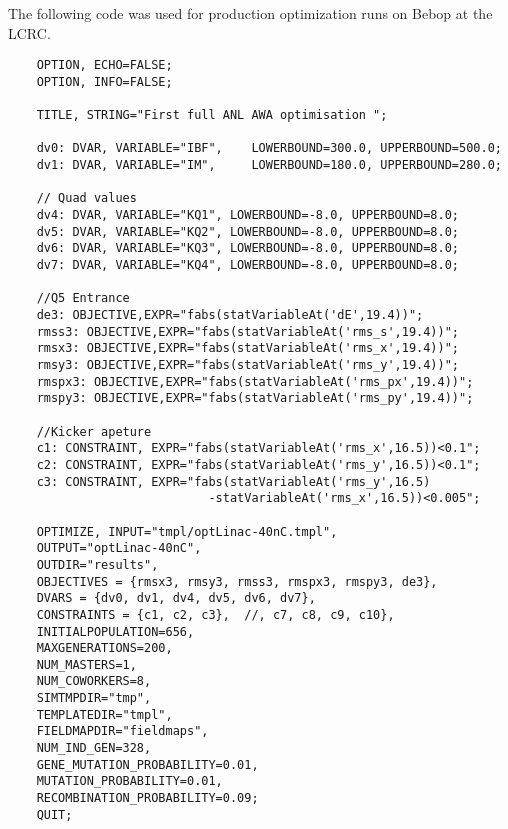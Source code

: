 \documentclass[table]{iitthesis}
\begin{document}
 \label{opt-tba-code}
The following code was used for production optimization runs on Bebop at the LCRC.
\makeatletter
\let\@currsize\normalsize
\makeatother 
\begin{singlespacing}
	\begin{verbatim}
	OPTION, ECHO=FALSE;
	OPTION, INFO=FALSE;
	
	TITLE, STRING="First full ANL AWA optimisation ";
	
	dv0: DVAR, VARIABLE="IBF",    LOWERBOUND=300.0, UPPERBOUND=500.0;
	dv1: DVAR, VARIABLE="IM",     LOWERBOUND=180.0, UPPERBOUND=280.0;
	
	// Quad values
	dv4: DVAR, VARIABLE="KQ1", LOWERBOUND=-8.0, UPPERBOUND=8.0;
	dv5: DVAR, VARIABLE="KQ2", LOWERBOUND=-8.0, UPPERBOUND=8.0;
	dv6: DVAR, VARIABLE="KQ3", LOWERBOUND=-8.0, UPPERBOUND=8.0;
	dv7: DVAR, VARIABLE="KQ4", LOWERBOUND=-8.0, UPPERBOUND=8.0;
	
	//Q5 Entrance
	de3: OBJECTIVE,EXPR="fabs(statVariableAt('dE',19.4))";
	rmss3: OBJECTIVE,EXPR="fabs(statVariableAt('rms_s',19.4))";
	rmsx3: OBJECTIVE,EXPR="fabs(statVariableAt('rms_x',19.4))";
	rmsy3: OBJECTIVE,EXPR="fabs(statVariableAt('rms_y',19.4))";
	rmspx3: OBJECTIVE,EXPR="fabs(statVariableAt('rms_px',19.4))";
	rmspy3: OBJECTIVE,EXPR="fabs(statVariableAt('rms_py',19.4))";
	
	//Kicker apeture
	c1: CONSTRAINT, EXPR="fabs(statVariableAt('rms_x',16.5))<0.1";
	c2: CONSTRAINT, EXPR="fabs(statVariableAt('rms_y',16.5))<0.1";
	c3: CONSTRAINT, EXPR="fabs(statVariableAt('rms_y',16.5)
							-statVariableAt('rms_x',16.5))<0.005";
	
	OPTIMIZE, INPUT="tmpl/optLinac-40nC.tmpl",
	OUTPUT="optLinac-40nC",
	OUTDIR="results",
	OBJECTIVES = {rmsx3, rmsy3, rmss3, rmspx3, rmspy3, de3},
	DVARS = {dv0, dv1, dv4, dv5, dv6, dv7},
	CONSTRAINTS = {c1, c2, c3},  //, c7, c8, c9, c10},
	INITIALPOPULATION=656,
	MAXGENERATIONS=200,
	NUM_MASTERS=1,
	NUM_COWORKERS=8,
	SIMTMPDIR="tmp",
	TEMPLATEDIR="tmpl",
	FIELDMAPDIR="fieldmaps",
	NUM_IND_GEN=328,
	GENE_MUTATION_PROBABILITY=0.01,
	MUTATION_PROBABILITY=0.01,
	RECOMBINATION_PROBABILITY=0.09;
	QUIT;
	\end{verbatim}	
\end{singlespacing}



\newpage
%
%


\end{document}
